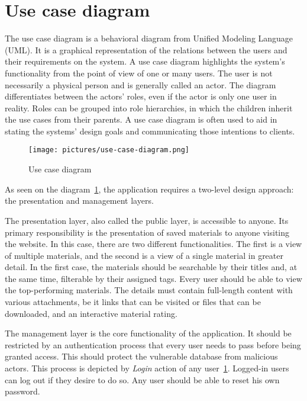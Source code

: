 \documentclass[
  digital,     %
  oneside,     %
  nosansbold,  %
  colorbold, %
  lof,         %
  lot,         %
]{fithesis4}
\begin{document}
\section{Use case diagram}

The use case diagram is a behavioral diagram from Unified Modeling Language (UML). It is a graphical representation of the relations between the users and their requirements on the system. A use case diagram highlights the system's functionality from the point of view of one or many users. The user is not necessarily a physical person and is generally called an actor. The diagram differentiates between the actors' roles, even if the actor is only one user in reality. Roles can be grouped into role hierarchies, in which the children inherit the use cases from their parents. A use case diagram is often used to aid in stating the systems' design goals and communicating those intentions to clients.

\begin{figure}
	\begin{center}
		\begin{minipage}{1\textwidth}
			\texttt{[image: pictures/use-case-diagram.png]}
		\end{minipage}
	\end{center}
	\caption{Use case diagram}
	\label{fig:use-case}
\end{figure}

As seen on the diagram~\ref{fig:use-case}, the application requires a two-level design approach: the presentation and management layers.

The presentation layer, also called the public layer, is accessible to anyone. Its primary responsibility is the presentation of saved materials to anyone visiting the website. In this case, there are two different functionalities. The first is a view of multiple materials, and the second is a view of a single material in greater detail. In the first case, the materials should be searchable by their titles and, at the same time, filterable by their assigned tags. Every user should be able to view the top-performing materials. The details must contain full-length content with various attachments, be it links that can be visited or files that can be downloaded, and an interactive material rating.

The management layer is the core functionality of the application. It should be restricted by an authentication process that every user needs to pass before being granted access. This should protect the vulnerable database from malicious actors. This process is depicted by \textit{Login} action of any user~\ref{fig:use-case}. Logged-in users can log out if they desire to do so. Any user should be able to reset his own password.
\end{document}
